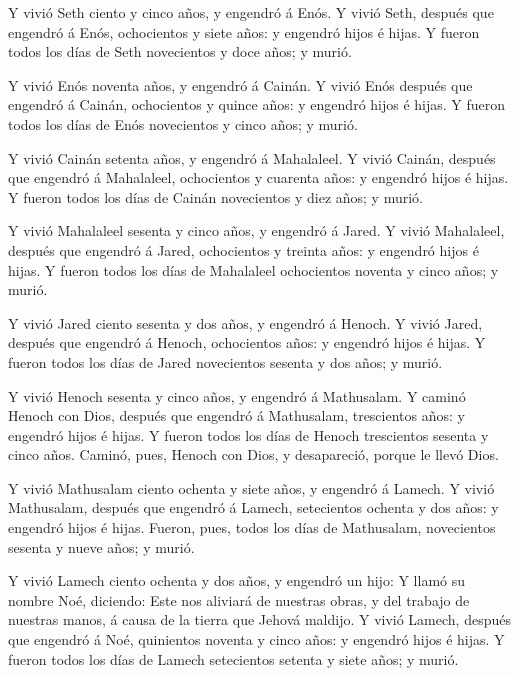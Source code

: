  Y vivió Seth ciento y cinco años, y engendró á Enós.
 Y vivió Seth, después que engendró á Enós, ochocientos y
siete años: y engendró hijos é hijas.  Y fueron todos los
días de Seth novecientos y doce años; y murió.

 Y vivió Enós noventa años, y engendró á Cainán.
 Y vivió Enós después que engendró á Cainán, ochocientos y
quince años: y engendró hijos é hijas.  Y fueron todos los
días de Enós novecientos y cinco años; y murió.

 Y vivió Cainán setenta años, y engendró á Mahalaleel.
 Y vivió Cainán, después que engendró á Mahalaleel,
ochocientos y cuarenta años: y engendró hijos é hijas.  Y
fueron todos los días de Cainán novecientos y diez años; y murió.

 Y vivió Mahalaleel sesenta y cinco años, y engendró á
Jared.  Y vivió Mahalaleel, después que engendró á Jared,
ochocientos y treinta años: y engendró hijos é hijas.  Y
fueron todos los días de Mahalaleel ochocientos noventa y cinco años; y
murió.

 Y vivió Jared ciento sesenta y dos años, y engendró á
Henoch.  Y vivió Jared, después que engendró á Henoch,
ochocientos años: y engendró hijos é hijas.  Y fueron todos
los días de Jared novecientos sesenta y dos años; y murió.

 Y vivió Henoch sesenta y cinco años, y engendró á
Mathusalam.  Y caminó Henoch con Dios, después que engendró
á Mathusalam, trescientos años: y engendró hijos é hijas. 
Y fueron todos los días de Henoch trescientos sesenta y cinco años.
 Caminó, pues, Henoch con Dios, y desapareció, porque le
llevó Dios.

 Y vivió Mathusalam ciento ochenta y siete años, y engendró
á Lamech.  Y vivió Mathusalam, después que engendró á
Lamech, setecientos ochenta y dos años: y engendró hijos é hijas.
 Fueron, pues, todos los días de Mathusalam, novecientos
sesenta y nueve años; y murió.

 Y vivió Lamech ciento ochenta y dos años, y engendró un
hijo:  Y llamó su nombre Noé, diciendo: Este nos aliviará
de nuestras obras, y del trabajo de nuestras manos, á causa de la tierra
que Jehová maldijo.  Y vivió Lamech, después que engendró á
Noé, quinientos noventa y cinco años: y engendró hijos é hijas.
 Y fueron todos los días de Lamech setecientos setenta y
siete años; y murió.

